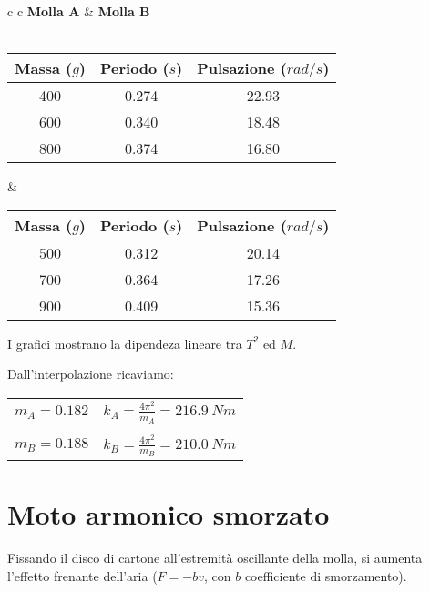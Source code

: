 \begin{center}

\begin{tabular}{c c}
\textbf{Molla A} & \hspace{2cm} \textbf{Molla B}\\
\\
\begin{tabular}{c | c| c}
Massa ($g$) & Periodo ($s$) & Pulsazione ($rad/s$)\\
\midrule
400 & 0.274 & 22.93\\
600 & 0.340 & 18.48\\
800 & 0.374 & 16.80\\
\end{tabular}

& \hspace{2cm}

\begin{tabular}{c | c | c}
Massa ($g$) & Periodo ($s$) & Pulsazione ($rad/s$)\\
\midrule
500 & 0.312 & 20.14\\
700 & 0.364 & 17.26\\
900 & 0.409 & 15.36\\
\end{tabular}

\end{tabular}

\end{center}

I grafici mostrano la dipendeza lineare tra $T^2$ ed $M$.

Dall'interpolazione ricaviamo:
\begin{center}
\begin{tabular}{c c}
$m_A=0.182$ & \hspace{1cm} $k_A=\displaystyle{\frac{4\pi^2}{m_A}}=216.9\ Nm$ \\
\\
$m_B=0.188$ & \hspace{1cm} $k_B=\displaystyle{\frac{4\pi^2}{m_B}}=210.0\ Nm$ \\
\end{tabular}
\end{center}
\section{Moto armonico smorzato}

Fissando il disco di cartone all'estremità oscillante della molla, si aumenta l'effetto frenante dell'aria ($F=-bv$, con $b$ coefficiente di smorzamento).  